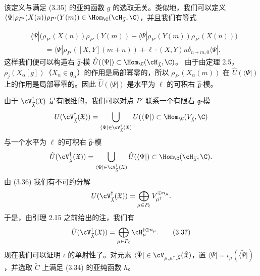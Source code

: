 \begin{sloppypar}该定义与满足 (3.35) 的亚纯函数 $g$ 的选取无关。类似地，我们可以定义
$\langle\Psi|\rho_{P'}(X(n))\rho_{P'}(Y(m))\in
\Hom_{\C}(\cH_{\vec{\lambda}},\C)$，并且我们有等式
\end{sloppypar}
\begin{equation}
\begin{aligned}
&\langle\Psi|\bigl(\rho_{P'}(X(n))\rho_{P'}(Y(m))
-\langle\Psi|\rho_{P'}(Y(m))\rho_{P'}(X(n))\bigr)\\
&\qquad=\langle\Psi|\rho_{P'}([X,Y](m+n))
+\ell\cdot(X,Y)n\delta_{n+m,0}\langle\Psi|.
\end{aligned}\tag{3.36}
\end{equation}
这样我们便可以构造右 $\hat{\mathfrak{g}}$-模
$\hat{U}(\langle\Psi|)\subset\Hom_{\C}(\cH_{\vec{\lambda}},\C)$。
由于由定理 2.5，$\rho_j(X_\alpha[g])$（$X_\alpha\in\mathfrak{g}_\alpha$）的作用是局部幂零的，所以 $\rho_{P'}(X_\alpha(m))$ 在 $\hat{U}(\langle\Psi|)$ 上的作用是局部幂零的。因此 $\hat{U}(\langle\Psi|)$ 是水平为 $\ell$ 的可积右 $\hat{\mathfrak{g}}$-模。

由于 $\cV^{\dagger}_{\vec{\lambda}}(\mathfrak{X})$ 是有限维的，我们可以对点 $P'$ 联系一个有限右 $\mathfrak{g}$-模
\[
U(\cV^{\dagger}_{\vec{\lambda}}(\mathfrak{X}))
=\bigcup_{\langle\Psi|\in\cV^{\dagger}_{\vec{\lambda}}(\mathfrak{X})}
U(\langle\Psi|)
\subset\Hom_{\C}(V_{\vec{\lambda}},\C)
\]
与一个水平为 $\ell$ 的可积右 $\hat{\mathfrak{g}}$-模
\[
\hat{U}(\cV^{\dagger}_{\vec{\lambda}}(\mathfrak{X}))
=\bigcup_{\langle\Psi|\in\cV^{\dagger}_{\vec{\lambda}}(\mathfrak{X})}
\hat{U}(\langle\Psi|)
\subset\Hom_{\C}(\cH_{\vec{\lambda}},\C).
\]
由 (3.36) 我们有不可约分解
\[
U(\cV^{\dagger}_{\vec{\lambda}}(\mathfrak{X}))
=\bigoplus_{\mu\in P_\ell}V_{\mu^{\dagger}}^{\oplus n_\mu}.
\]
于是，由引理 2.15 之前给出的注，我们有
\begin{equation}
\hat{U}(\cV^{\dagger}_{\vec{\lambda}}(\mathfrak{X}))
=\bigoplus_{\mu\in P_\ell}\cH^{\dagger\oplus n_\mu}_{\mu}. \tag{3.37}
\end{equation}
现在我们可以证明 $\iota$ 的单射性了。对元素
$\langle\tilde\Psi|\in\cV_{\mu,\mu^{\dagger},\vec{\lambda}}
(\tilde{\mathfrak{X}})$，置 $\langle\Psi|=\iota_{\mu}(\langle\tilde\Psi|)$，并选取 $\tilde{C}$ 上满足 (3.34) 的亚纯函数 $h$。

